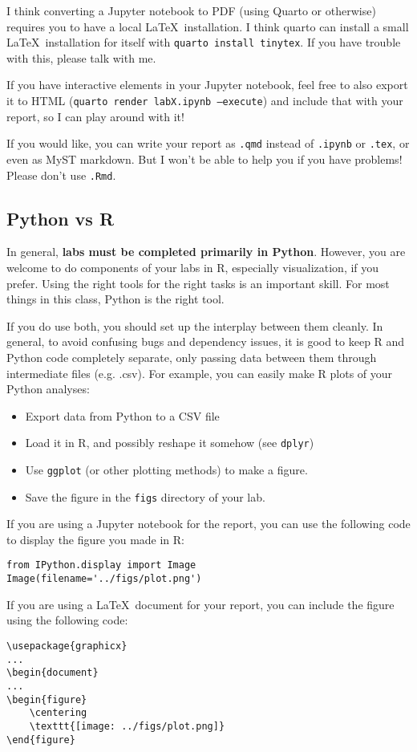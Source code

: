 \documentclass[letterpaper,12pt]{article}
\begin{document}
I think converting a Jupyter notebook to PDF (using Quarto or otherwise) requires you to have a local \LaTeX\ installation. I think quarto can install a small \LaTeX\ installation for itself with \texttt{quarto install tinytex}. If you have trouble with this, please talk with me.

If you have interactive elements in your Jupyter notebook, feel free to also export it to HTML (\texttt{quarto render labX.ipynb --execute}) and include that with your report, so I can play around with it!

If you would like, you can write your report as \texttt{.qmd} instead of \texttt{.ipynb} or \texttt{.tex}, or even as MyST markdown. But I won't be able to help you if you have problems! Please don't use \texttt{.Rmd}.

\subsection{Python vs R}
In general, \textbf{labs must be completed primarily in Python}. However, you are welcome to do components of your labs in R, especially visualization, if you prefer. Using the right tools for the right tasks is an important skill. For most things in this class, Python is the right tool.

If you do use both, you should set up the interplay between them cleanly. In general, to avoid confusing bugs and dependency issues, it is good to keep R and Python code completely separate, only passing data between them through intermediate files (e.g. .csv). For example, you can easily make R plots of your Python analyses:
\begin{itemize}
    \item Export data from Python to a CSV file
    \item Load it in R, and possibly reshape it somehow (see \texttt{dplyr})
    \item Use \texttt{ggplot} (or other plotting methods) to make a figure.
    \item Save the figure in the \texttt{figs} directory of your lab.
\end{itemize}
If you are using a Jupyter notebook for the report, you can use the following code to display the figure you made in R:
\begin{verbatim}
from IPython.display import Image
Image(filename='../figs/plot.png')
\end{verbatim}
If you are using a \LaTeX\ document for your report, you can include the figure using the following code:
\begin{verbatim}
\usepackage{graphicx}
...
\begin{document}
...
\begin{figure}
    \centering
    \texttt{[image: ../figs/plot.png]}
\end{figure}
\end{verbatim}
\end{document}
